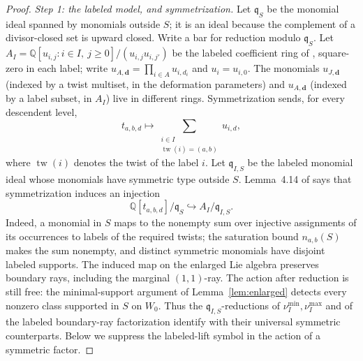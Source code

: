 \documentclass[11pt]{amsart}
\theoremstyle{definition}
\theoremstyle{remark}
\newcommand{\QQ}{\mathbb{Q}}
\begin{document}
\begin{proof}
\emph{Step 1: the labeled model, and symmetrization.}
Let $\mathfrak q_S$ be the monomial ideal spanned by monomials outside $S$;
it is an ideal because the complement of a divisor-closed set is upward
closed.  Write a bar for reduction modulo $\mathfrak q_S$. Let
$A_I=\QQ[u_{i,j}:i\in I,\ j\ge0]/(u_{i,j}u_{i,j'})$ be the labeled
coefficient ring of \cite[Def.~4.6]{GKT}, square-zero in each label; write
$u_{A,\mathbf d}=\prod_{i\in A}u_{i,d_i}$ and $u_{i}=u_{i,0}$. The monomials
$u_{J,\mathbf d}$ (indexed by a twist multiset, in the deformation
parameters) and $u_{A,\mathbf d}$ (indexed by a label subset, in $A_{I}$)
live in different rings.
Symmetrization sends, for every descendent level,
\[
t_{a,b,d}\longmapsto
\sum_{\substack{i\in I\\\operatorname{tw}(i)=(a,b)}}u_{i,d},
\]
where $\operatorname{tw}(i)$ denotes the twist of the label $i$.
Let $\mathfrak q_{I,S}$ be the labeled monomial ideal whose monomials have
symmetric type outside $S$.  Lemma~4.14 of \cite{GKT} says that symmetrization induces
an injection
\[
 \QQ[t_{a,b,d}]/\mathfrak q_S\hookrightarrow A_I/\mathfrak q_{I,S}.
\]
Indeed, a monomial in $S$ maps to the nonempty sum over injective assignments
of its occurrences to labels of the required twists; the saturation bound
$n_{a,b}(S)$ makes the sum nonempty, and distinct symmetric monomials have
disjoint labeled supports. The induced
map on the enlarged Lie algebra preserves boundary rays, including the
marginal $(1,1)$-ray. The action after reduction is still free: the
minimal-support argument of Lemma~\ref{lem:enlarged} detects every nonzero
class supported in $S$ on $W_0$.
Thus the $\mathfrak q_{I,S}$-reductions of $\nu_I^{\min},\nu_I^{\max}$ and of the labeled
boundary-ray factorization identify with their universal symmetric counterparts. Below we
suppress the labeled-lift symbol in the action of a symmetric factor.


\end{proof}
\end{document}
